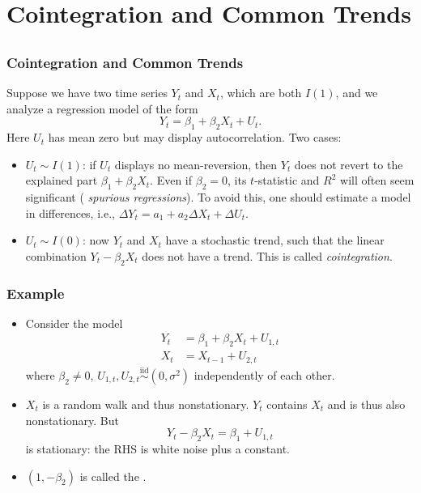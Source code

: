

\frame{\titlepage}




\section{Cointegration and Common Trends}\subsection*{}
\begin{frame}%

\frametitle{Cointegration and Common Trends}

Suppose we have two time series $Y_{t}$ and $X_{t}$, which are both $I(1)$,
and we analyze a regression model of the form%
\begin{equation*}
Y_{t}=\beta _{1}+\beta _{2}X_{t}+U_{t}.
\end{equation*}%
Here $U_{t}$ has mean zero but may display autocorrelation. Two cases:

\begin{itemize}
\item $U_{t}\sim I(1)$: if $U_{t}$ displays no mean-reversion, then $Y_{t}$
does not revert to the explained part $\beta_1 +\beta_2 X_{t}$. Even if $%
\beta_2 =0$, its $t$-statistic and $R^{2}$ will often seem significant (%
\emph{\color{red}spurious regressions}). To avoid this, one should estimate
a model in differences, i.e., $\Delta Y_{t}=a_1 + a_2 \Delta X_{t}+\Delta
U_{t}$.

\item $U_{t}\sim I(0)$: now $Y_{t}$ and $X_{t}$ have a 
stochastic trend, such that the linear combination $Y_{t}-\beta_2 X_{t}$
does not have a trend. This is called \emph{\color{red}cointegration}.
\end{itemize}

\end{frame}%
\begin{frame}%
\frametitle{Example}
\begin{itemize}
\item Consider the model
\begin{align*}
Y_t&=\beta_1 +\beta_2 X_t+U_{1,t}\\
X_t&=X_{t-1}+U_{2,t}
\end{align*}
where $\beta_2\neq0$, $U_{1,t},U_{2,t}\stackrel{\mathrm{iid}}{\sim}(0,\sigma^2)$ independently of each other.
\item $X_t$ is a random walk and thus nonstationary. $Y_t$ contains $X_t$ and is thus also nonstationary. But
\[
Y_t-\beta_2 X_t=\beta_1 +U_{1,t}
\]
is stationary: the RHS is white noise plus a constant.
\item $(1, -\beta_2)$ is called the .
\end{itemize}
\end{frame}%
